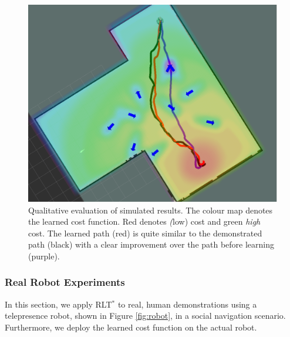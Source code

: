 \documentclass[a4paper,11pt]{report}
\begin{document}
	\begin{figure}[tbh]
	\centering
    \includegraphics[scale=0.12]{figures/kino_paths.png}
    \caption{Qualitative evaluation of simulated results. The colour map denotes the learned cost function. Red denotes \emph(low) cost and green \emph{high} cost. The learned path (red) is quite similar to the demonstrated path (black) with a clear improvement over the path before learning (purple).}
    \vspace{-2mm}
  \label{fig:results_qual}
  \end{figure}

	\subsubsection{Real Robot Experiments}
	In this section, we apply RLT$^*$ to real, human demonstrations using a telepresence robot, shown in Figure \ref{fig:robot}, in a social navigation scenario. Furthermore, we deploy the learned cost function on the actual robot.
\end{document}
